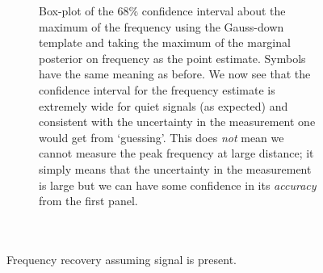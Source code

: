 \documentclass[showpacs, superscriptaddress, showpacs, letterpaper, showkeys,
preprintnumbers, altaffilletter, amssymb, amsmath, amsfonts, prd,
onecolumn, floatfix, nofootinbib]{revtex4-1}
\begin{document}
\begin{figure}
\begin{subfigure}{0.45\textwidth}
\caption{Box-plot of the 68\% confidence interval about the maximum of the
frequency using the Gauss-down template and taking the maximum of the marginal
posterior on frequency as the point estimate.  Symbols have the same meaning as
before.  We now see that the confidence interval for the frequency estimate is
extremely wide for quiet signals (as expected) and consistent with the
uncertainty in the measurement one would get from `guessing'.  This does
\emph{not} mean we cannot measure the peak frequency at large distance; it
simply means that the uncertainty in the measurement is large but we can have
some confidence in its \emph{accuracy} from the first panel.\label{fig:freqwidth}\\~\\~\\}
\end{subfigure}
\caption{Frequency recovery assuming signal is present.\label{fig:freqrecovery}}
\end{figure}
\end{document}
